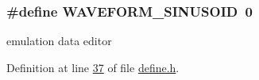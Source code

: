 \hypertarget{a00034_aab68961c5134b28289cb1311cac7d500}{
\subsubsection[{W\+A\+V\+E\+F\+O\+R\+M\+\_\+\+S\+I\+N\+U\+S\+O\+I\+D}]{\setlength{\rightskip}{0pt plus 5cm}\#define W\+A\+V\+E\+F\+O\+R\+M\+\_\+\+S\+I\+N\+U\+S\+O\+I\+D~0}}\label{a00034_aab68961c5134b28289cb1311cac7d500}


emulation data editor 



Definition at line \hyperlink{a00034_source_l00037}{37} of file \hyperlink{a00034_source}{define.\+h}.

